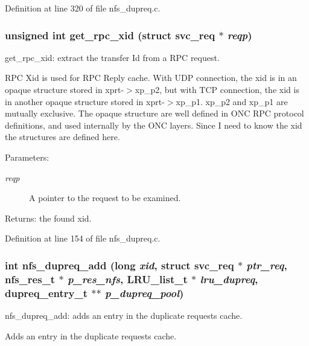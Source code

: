 Definition at line 320 of file nfs\_\-dupreq.c.
\subsubsection{\setlength{\rightskip}{0pt plus 5cm}unsigned int get\_\-rpc\_\-xid (struct svc\_\-req $\ast$ {\em reqp})}\label{nfs__dupreq_8c_a7}


get\_\-rpc\_\-xid: extract the transfer Id from a RPC request.

RPC Xid is used for RPC Reply cache. With UDP connection, the xid is in an opaque structure stored in xprt-$>$xp\_\-p2, but with TCP connection, the xid is in another opaque structure stored in xprt-$>$xp\_\-p1. xp\_\-p2 and xp\_\-p1 are mutually exclusive. The opaque structure are well defined in ONC RPC protocol definitions, and used internally by the ONC layers. Since I need to know the xid the structures are defined here.

\begin{Desc}
\item[Parameters:]
\begin{description}
\item[{\em reqp}]A pointer to the request to be examined.\end{description}
\end{Desc}
\begin{Desc}
\item[Returns:]the found xid. \end{Desc}


Definition at line 154 of file nfs\_\-dupreq.c.
\subsubsection{\setlength{\rightskip}{0pt plus 5cm}int nfs\_\-dupreq\_\-add (long {\em xid}, struct svc\_\-req $\ast$ {\em ptr\_\-req}, nfs\_\-res\_\-t $\ast$ {\em p\_\-res\_\-nfs}, LRU\_\-list\_\-t $\ast$ {\em lru\_\-dupreq}, dupreq\_\-entry\_\-t $\ast$$\ast$ {\em p\_\-dupreq\_\-pool})}\label{nfs__dupreq_8c_a15}


nfs\_\-dupreq\_\-add: adds an entry in the duplicate requests cache.

Adds an entry in the duplicate requests cache.

